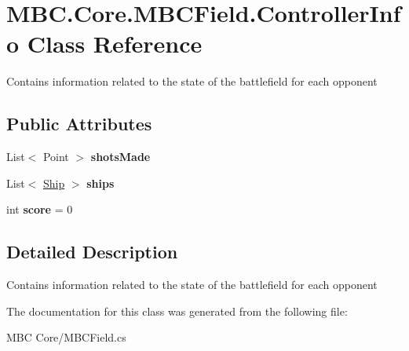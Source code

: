 \hypertarget{class_m_b_c_1_1_core_1_1_m_b_c_field_1_1_controller_info}{\section{M\-B\-C.\-Core.\-M\-B\-C\-Field.\-Controller\-Info Class Reference}
\label{class_m_b_c_1_1_core_1_1_m_b_c_field_1_1_controller_info}
}


Contains information related to the state of the battlefield for each opponent 


\subsection*{Public Attributes}
\begin{DoxyCompactItemize}
\item 
\hypertarget{class_m_b_c_1_1_core_1_1_m_b_c_field_1_1_controller_info_a0c46213ff69697dd964f53a732387798}{List$<$ Point $>$ {\bfseries shots\-Made}}\label{class_m_b_c_1_1_core_1_1_m_b_c_field_1_1_controller_info_a0c46213ff69697dd964f53a732387798}

\item 
\hypertarget{class_m_b_c_1_1_core_1_1_m_b_c_field_1_1_controller_info_ae5f9d0240790aa0021cdd8bc3d18d493}{List$<$ \hyperlink{class_m_b_c_1_1_core_1_1_ship}{Ship} $>$ {\bfseries ships}}\label{class_m_b_c_1_1_core_1_1_m_b_c_field_1_1_controller_info_ae5f9d0240790aa0021cdd8bc3d18d493}

\item 
\hypertarget{class_m_b_c_1_1_core_1_1_m_b_c_field_1_1_controller_info_a0a4e045e294a2de5d4edfc2ae4d760a3}{int {\bfseries score} = 0}\label{class_m_b_c_1_1_core_1_1_m_b_c_field_1_1_controller_info_a0a4e045e294a2de5d4edfc2ae4d760a3}

\end{DoxyCompactItemize}


\subsection{Detailed Description}
Contains information related to the state of the battlefield for each opponent

The documentation for this class was generated from the following file\-:\begin{DoxyCompactItemize}
\item 
M\-B\-C Core/M\-B\-C\-Field.\-cs\end{DoxyCompactItemize}
